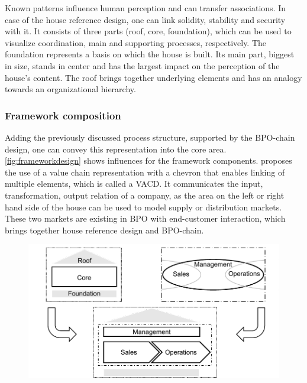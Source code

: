 	Known patterns influence human perception \citep{kroeber1997} and can transfer associations. In case of the house reference design, one can link solidity, stability and security \citep[]{Meise2001} with it. It consists of three parts (roof, core, foundation), which can be used to visualize coordination, main and supporting processes, respectively. The foundation represents a basis on which the house is built. Its main part, biggest in size, stands in center and has the largest impact on the perception of the house's content. The roof brings together underlying elements and has an analogy towards an organizational hierarchy. 
	
	\subsubsection{Framework composition}
	
	Adding the previously discussed process structure, supported by the BPO-chain design, one can convey this representation into the core area. \Fig \ref{fig:frameworkdesign} shows influences for the framework components. 
	\citeauthor{Meise2001} proposes the use of a value chain representation with a chevron that enables linking of multiple elements, which is called a \acrfull{VACD}. It communicates the input, transformation, output relation of a company, as the area on the left or right hand side of the house can be used to model supply or distribution markets. 
	These two markets are existing in BPO with end-customer interaction, which brings together house reference design and \acrshort{BPO}-chain. 
	
	\begin{figure}[caption={Framework Design Influences}, label={fig:frameworkdesign}]
		{	\includegraphics[width=.8\textwidth]{figures/frameworkdesign.pdf}}
	\end{figure} 
	
